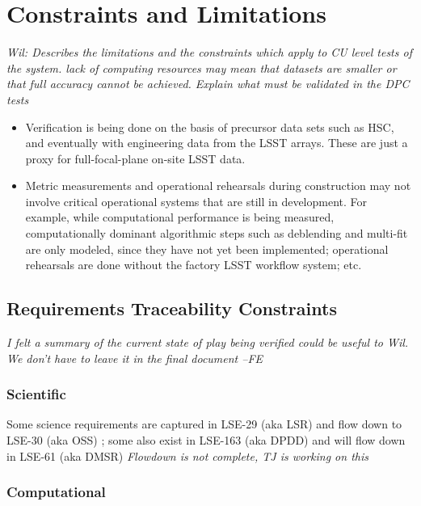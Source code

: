 \section{Constraints and Limitations}

\textit{Wil: Describes the limitations and the constraints which apply to CU level tests of the system. lack of computing resources may mean that datasets are smaller or that full accuracy cannot be achieved. Explain what must be validated in the DPC tests}

\begin{itemize}

\item Verification is being done on the basis of precursor data sets such as HSC, and eventually with engineering data from the LSST arrays. These are just a proxy for full-focal-plane on-site LSST data. 

\item Metric measurements and operational rehearsals during construction may not involve critical operational systems that are still in development. For example, while computational performance is being measured, computationally dominant algorithmic steps such as deblending and multi-fit are only modeled, since they have not yet been implemented; operational rehearsals are done without the factory LSST workflow system; etc.

\end{itemize}

\subsection{Requirements Traceability Constraints}

\textit{I felt a summary of the current state of play being verified could be useful to Wil. We don't have to leave it in the final document --FE}

\subsubsection{Scientific}

Some science requirements are captured in LSE-29 (aka LSR) and  flow down to LSE-30 (aka OSS) ; some also exist in LSE-163 (aka DPDD) and will flow down in LSE-61 (aka DMSR) \textit{Flowdown is not complete, TJ is working on this}

\subsubsection{Computational}

